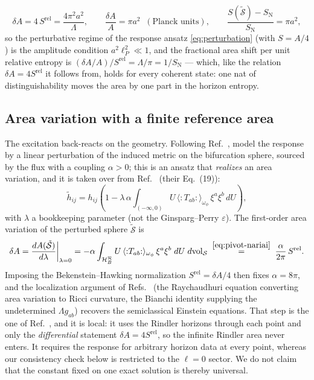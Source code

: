 \documentclass[11pt]{article}
\newcommand{\Srel}{S^{\mathrm{rel}}}
\begin{document}
\begin{equation}
\delta A = 4\,\Srel = \frac{4\pi^2 a^2}{\Lambda},
\qquad
\frac{\delta A}{A} = \pi a^2
\;\;(\text{Planck units}),
\qquad
\frac{S(\tilde{\mathcal{S}})-S_{\mathrm N}}{S_{\mathrm N}} = \pi a^2,
\label{eq:example-area}
\end{equation}
so the perturbative regime of the response ansatz \eqref{eq:perturbation} (with $S=A/4$) is the amplitude condition $a^2 \ell_P^2 \ll 1$, and the fractional area shift per unit relative entropy is $(\delta A/A)/\Srel = \Lambda/\pi = 1/S_{\mathrm{N}}$ --- which, like the relation $\delta A=4\Srel$ it follows from, holds for every coherent state: one nat of distinguishability moves the area by one part in the horizon entropy.

\subsection{Area variation with a finite reference area}

The excitation back-reacts on the geometry. Following Ref.~\cite{DorauMuch}, model the response by a linear perturbation of the induced metric on the bifurcation sphere, sourced by the flux with a coupling $\alpha > 0$; this is an ansatz that \emph{realizes} an area variation, and it is taken over from Ref.~\cite{DorauMuch} (their Eq.~(19)):
\begin{equation}
\tilde{h}_{ij}
= h_{ij}\left(1 - \lambda\,\alpha \int_{(-\infty,0)} U\, \langle{:}T_{ab}{:}\rangle_{\omega_\phi}\, \xi^a\xi^b \, dU \right),
\label{eq:perturbation}
\end{equation}
with $\lambda$ a bookkeeping parameter (not the Ginsparg--Perry $\varepsilon$). The first-order area variation of the perturbed sphere $\tilde{\mathcal{S}}$ is
\begin{equation}
\delta A
= \frac{dA(\tilde{\mathcal{S}})}{d\lambda}\bigg|_{\lambda = 0}
= -\alpha \int_{\mathcal{H}_B^{\mathcal{R}}} U\, \langle{:}T_{ab}{:}\rangle_{\omega_\phi}\, \xi^a\xi^b \; dU\; d\mathrm{vol}_{\mathcal{S}}
\;\overset{\eqref{eq:pivot-nariai}}{=}\;
\frac{\alpha}{2\pi}\, \Srel .
\label{eq:deltaA-nariai}
\end{equation}
Imposing the Bekenstein--Hawking normalization $\Srel = \delta A / 4$ then fixes $\alpha = 8\pi$, and the localization argument of Refs.~\cite{Jacobson,DorauMuch} (the Raychaudhuri equation converting area variation to Ricci curvature, the Bianchi identity supplying the undetermined $\Lambda g_{ab}$) recovers the semiclassical Einstein equations. That step is the one of Ref.~\cite{DorauMuch}, and it is local: it uses the Rindler horizons through each point and only the \emph{differential} statement $\delta A=4\Srel$, so the infinite Rindler area never enters. It requires the response for arbitrary horizon data at every point, whereas our consistency check below is restricted to the $\ell=0$ sector. We do not claim that the constant fixed on one exact solution is thereby universal.
\end{document}
